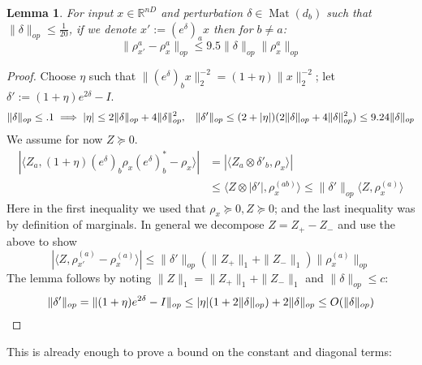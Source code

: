 \documentclass[aos]{imsart}
\newtheorem{lemma}[theorem]{Lemma}
\theoremstyle{definition}
\numberwithin{equation}{section}
\DeclareMathOperator{\mat}{Mat}
\newcommand{\R}{{\mathbb{R}}}
\newcommand{\samp}{x}
\newcommand{\CF}[1]{{\color{purple}[CF: #1]}}
\newcommand{\AR}[1]{{\color{orange}[AR: #1]}}
\begin{document}
\begin{appendix}
\begin{lemma} \label{btoaaRobustness}
For input $\samp \in \R^{nD}$ and perturbation $\delta \in \mat(d_{b})$ such that $\|\delta\|_{op} \leq \frac{1}{20}$, if we denote $\samp' := (e^{\delta})_{a} \samp$ then for $b \neq a$:
\[ \|\rho_{\samp'}^{a} - \rho_{\samp}^{a}\|_{op} \leq 9.5 \|\delta\|_{op} \|\rho_{\samp}^{a}\|_{op}      \]
\end{lemma}
\begin{proof}
Choose $\eta$ such that $\|(e^{\delta})_{b} \samp\|_{2}^{-2} = (1+\eta) \|\samp\|_{2}^{-2}$; let $\delta' := (1+\eta)e^{2\delta} - I$.
\[ \|\delta\|_{op} \leq .1 \implies |\eta| \leq 2\|\delta\|_{op} + 4\|\delta\|_{op}^{2}, \hspace{3mm} \|\delta'\|_{op} \leq (2+|\eta|)(2\|\delta\|_{op} + 4\|\delta\|_{op}^{2}) \leq 9.24 \|\delta\|_{op} \]
We assume for now $Z \succeq 0$.
\begin{align*} | \langle Z_{a}, (1+\eta) (e^{\delta})_{b} \rho_{\samp} (e^{\delta})_{b}^{*} - \rho_{\samp} \rangle|
& = | \langle Z_{a} \otimes \delta'_{b}, \rho_{\samp} \rangle   |  \\
&\leq \langle Z \otimes |\delta'|, \rho_{\samp}^{(ab)} \rangle
\leq \|\delta'\|_{op} \langle Z, \rho_{\samp}^{(a)} \rangle
\end{align*}
Here in the first inequality we used that $\rho_{\samp} \succeq 0, Z \succeq 0$; and the last inequality was by definition of marginals.
In general we decompose $Z = Z_{+} - Z_{-}$ and use the above to show
\[ |\langle Z, \rho_{\samp'}^{(a)} - \rho_{\samp}^{(a)} \rangle| \leq \|\delta'\|_{op} (\|Z_{+}\|_{1} + \|Z_{-}\|_{1}) \|\rho_{\samp}^{(a)}\|_{op}     \]
The lemma follows by noting $\|Z\|_{1} = \|Z_{+}\|_{1} + \|Z_{-}\|_{1}$ and $\|\delta\|_{op} \leq c$:
\[ \|\delta'\|_{op} = \|(1+\eta) e^{2 \delta} - I\|_{op} \leq |\eta|(1 + 2 \|\delta\|_{op}) + 2\|\delta\|_{op} \leq O(\|\delta\|_{op})   \qedhere  \]
\end{proof}

This is already enough to prove a bound on the constant and diagonal terms:


\end{appendix}
\end{document}
